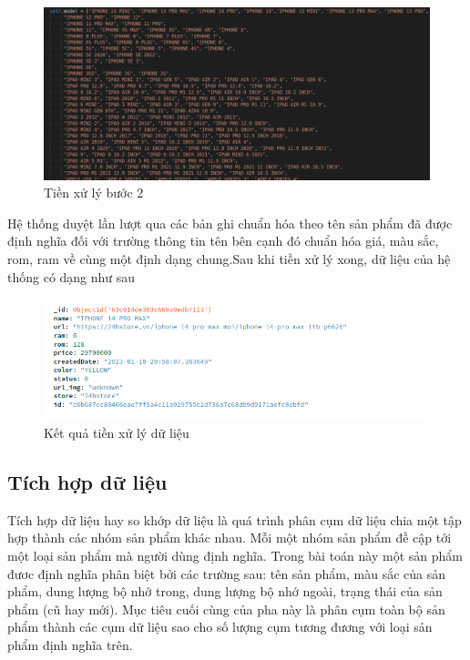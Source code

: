 \documentclass[../DoAn.tex]{subfiles}
\begin{document}
\begin{itemize}
    \begin{figure}[H]
        \centering
        \includegraphics[scale=0.3]{Hinhve/preprocess_step2.png}
        \caption{Tiền xử lý bước 2}
        \label{fig:my_label2}
    \end{figure}

    Hệ thống duyệt lần lượt qua các bản ghi chuẩn hóa theo tên sản phẩm đã được định nghĩa đối với trường thông tin tên bên cạnh đó chuẩn hóa giá, màu sắc, rom, ram về cùng một định dạng chung.Sau khi tiền xử lý xong, dữ liệu của hệ thống có dạng như sau
\end{itemize}

\begin{figure}[H]
    \centering
    \includegraphics[scale=0.68]{Hinhve/preprocess_final_res.png}
    \caption{Kết quả tiền xử lý dữ liệu}
    \label{fig:my_label2}
\end{figure}

\subsection{Tích hợp dữ liệu}
Tích hợp dữ liệu hay so khớp dữ liệu là quá trình phân cụm dữ liệu chia một tập hợp thành các nhóm sản phẩm khác nhau. Mỗi một nhóm sản phẩm đề cập tới một loại sản phẩm mà người dùng định nghĩa. Trong bài toán này một sản phẩm đươc định nghĩa phân biệt bởi các trường sau: tên sản phẩm, màu sắc của sản phẩm, dung lượng bộ nhớ trong, dung lượng bộ nhớ ngoài, trạng thái của sản phẩm (cũ hay mới). Mục tiêu cuối cùng của pha này là phân cụm toàn bộ sản phẩm thành các cụm dữ liệu sao cho số lượng cụm tương đương với loại sản phẩm định nghĩa trên. 
\end{document}
